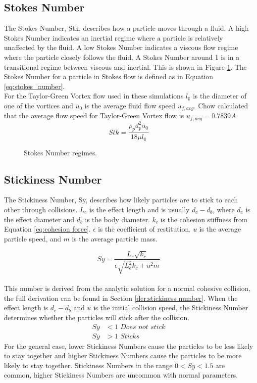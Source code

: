 \documentclass[a4paper,11pt,titlepage]{report}
\begin{document}
\subsection{Stokes Number}
\label{sec:stokes number}
The Stokes Number, Stk, describes how a particle moves through a fluid. A high Stokes Number indicates an inertial regime where a particle is relatively unaffected by the fluid. A low Stokes Number indicates a viscous flow regime where the particle closely follows the fluid. A Stokes Number around 1 is in a transitional regime between viscous and inertial. This is shown in Figure \ref{fig:stokes_number}. The Stokes Number for a particle in Stokes flow is defined as in Equation \ref{eq:stokes_number}\cite{achow}.
\\For the Taylor-Green Vortex flow used in these simulations $l_0$ is the diameter of one of the vortices and $u_0$ is the average fluid flow speed $u_{f,avg}$. Chow\cite{achow} calculated that the average flow speed for Taylor-Green Vortex flow is $u_{f,avg} = 0.7839A$.
\begin{equation}
Stk = \dfrac{\rho_p d_p^2 u_0}{18 \mu l_0}
\label{eq:stokes_number}
\end{equation}
\begin{figure}[!htb]
\centering

\caption{Stokes Number regimes.}
\label{fig:stokes_number}
\end{figure}
\subsection{Stickiness Number}
\label{sec:stickiness number}
The Stickiness Number, Sy, describes how likely particles are to stick to each other through collisions. $L_e$ is the effect length and is usually $d_e - d_b$, where $d_e$ is the effect diameter and $d_b$ is the body diameter. $k_c$ is the cohesion stiffness from Equation \ref{eq:cohesion force}. $\epsilon$ is the coefficient of restitution, $u$ is the average particle speed, and $m$ is the average particle mass.

\begin{equation}
Sy = \dfrac{L_e \sqrt{k_c}}{\epsilon \sqrt{L_e^2 k_c + u^2 m}}
\end{equation}
\\This number is derived from the analytic solution for a normal cohesive collision, the full derivation can be found in Section \ref{der:stickiness number}. When the effect length is $d_e - d_b$ and $u$ is the initial collision speed, the Stickiness Number determines whether the particles will stick after the collision.
\begin{align*}
Sy &< 1 \textit{ Does not stick}
\\ Sy & > 1 \textit{ Sticks}
\end{align*}
For the general case, lower Stickiness Numbers cause the particles to be less likely to stay together and higher Stickiness Numbers cause the particles to be more likely to stay together. Stickiness Numbers in the range $0 < Sy < 1.5$ are common, higher Stickiness Numbers are uncommon with normal parameters.
\end{document}
